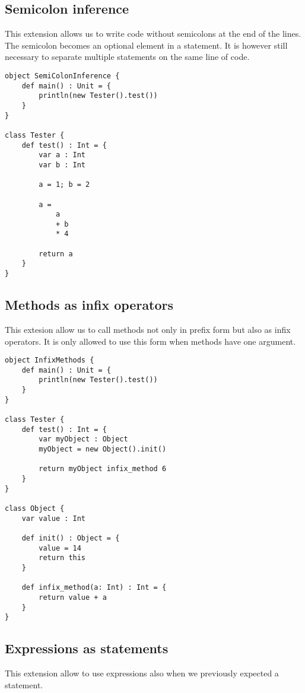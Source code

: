 \subsection{Semicolon inference}

This extension allows us to write code without semicolons at the end of the lines. The semicolon becomes an optional element in a statement. It is however still necessary to separate multiple statements on the same line of code.

\begin{lstlisting}
object SemiColonInference {
    def main() : Unit = {
        println(new Tester().test())
    }
}

class Tester {
    def test() : Int = {
		var a : Int
		var b : Int

		a = 1; b = 2

		a =
			a
			+ b
			* 4

		return a
    }
}
\end{lstlisting}

\subsection{Methods as infix operators}

This extesion allow us to call methods not only in prefix form but also as infix operators. It is only allowed to use this form when methods have one argument.

\begin{lstlisting}
object InfixMethods {
    def main() : Unit = {
        println(new Tester().test())
    }
}

class Tester {
    def test() : Int = {
		var myObject : Object
		myObject = new Object().init()

		return myObject infix_method 6
    }
}

class Object {
	var value : Int

	def init() : Object = {
		value = 14
		return this
	}

	def infix_method(a: Int) : Int = {
		return value + a
	}
}
\end{lstlisting}

\subsection{Expressions as statements}

This extension allow to use expressions also when we previously expected a statement.

